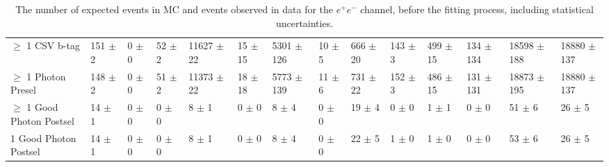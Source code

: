 \begin{table}
{\begin{tabular}{|l|l|l|l|l|l|l|l|l|l|l|l|l|l|}
$\geq$ 1 CSV b-tag & 151 $\pm$ 2 \ & 0 $\pm$ 0 \ & 52 $\pm$ 2 \ & 11627 $\pm$ 22 \ & 15 $\pm$ 15 \ & 5301 $\pm$ 126 \ & 10 $\pm$ 5 \ & 666 $\pm$ 20 \ & 143 $\pm$ 3 \ & 499 $\pm$ 15 \ & 134 $\pm$ 134\ & 18598 $\pm$ 188 \ & 18880 $\pm$ 137 \\
$\geq$ 1 Photon Presel & 148 $\pm$ 2 \ & 0 $\pm$ 0 \ & 51 $\pm$ 2 \ & 11373 $\pm$ 22 \ & 18 $\pm$ 18 \ & 5773 $\pm$ 139 \ & 11 $\pm$ 6 \ & 731 $\pm$ 22 \ & 152 $\pm$ 3 \ & 486 $\pm$ 15 \ & 131 $\pm$ 131\ & 18873 $\pm$ 195 \ & 18880 $\pm$ 137 \\
$\geq$ 1 Good Photon Postsel & 14 $\pm$ 1 \ & 0 $\pm$ 0 \ & 0 $\pm$ 0 \ & 8 $\pm$ 1 \ & 0 $\pm$ 0 \ & 8 $\pm$ 4 \ & 0 $\pm$ 0 \ & 19 $\pm$ 4 \ & 0 $\pm$ 0 \ & 1 $\pm$ 1 \ & 0 $\pm$ 0\ & 51 $\pm$ 6 \ & 26 $\pm$ 5 \\
1 Good Photon Postsel & 14 $\pm$ 1 \ & 0 $\pm$ 0 \ & 0 $\pm$ 0 \ & 8 $\pm$ 1 \ & 0 $\pm$ 0 \ & 8 $\pm$ 4 \ & 0 $\pm$ 0 \ & 22 $\pm$ 5 \ & 1 $\pm$ 0 \ & 1 $\pm$ 0 \ & 0 $\pm$ 0\ & 53 $\pm$ 6 \ & 26 $\pm$ 5 \\


\hline
\end{tabular}
}
\caption{The number of expected events in MC and events observed in data for the $e^+e^-$ channel, before the fitting process, including statistical uncertainties.}
\label{tab-cutflowEE}
\end{table}

